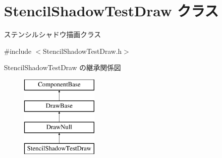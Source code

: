 \hypertarget{class_stencil_shadow_test_draw}{}\section{Stencil\+Shadow\+Test\+Draw クラス}
\label{class_stencil_shadow_test_draw}


ステンシルシャドウ描画クラス  




{\ttfamily \#include $<$Stencil\+Shadow\+Test\+Draw.\+h$>$}

Stencil\+Shadow\+Test\+Draw の継承関係図\begin{figure}[H]
\begin{center}
\leavevmode
\includegraphics[height=4.000000cm]{class_stencil_shadow_test_draw}
\end{center}
\end{figure}
